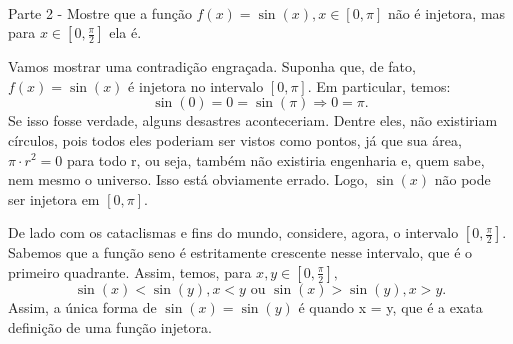\documentclass[Calculus1/exercícios_de_cálculo.tex]{subfiles}
\begin{document}
\paragraph{}Parte 2 - Mostre que a função $f(x) = \sin(x), x\in[0, \pi]$ não é injetora, mas para $x\in[0, \frac{\pi}{2}]$ ela é.
\begin{proof*}
	Vamos mostrar uma contradição engraçada. Suponha que, de fato, $f(x) = \sin(x)$ é injetora no intervalo $[0, \pi]$. Em particular, temos:
	$$
		\sin(0) = 0 = \sin(\pi) \Rightarrow 0 = \pi.
	$$
	Se isso fosse verdade, alguns desastres aconteceriam. Dentre eles, não existiriam círculos, pois todos eles poderiam ser vistos como pontos, já que sua área, $\pi\cdot{r^2} = 0$ para todo r, ou seja, também não existiria engenharia e, quem sabe, nem mesmo o universo. Isso está obviamente errado. Logo, $\sin(x)$ n\~ao pode ser injetora em $[0, \pi].$

	De lado com os cataclismas e fins do mundo, considere, agora, o intervalo $[0, \frac{\pi}{2}].$ Sabemos que a função seno é estritamente crescente nesse intervalo, que é o primeiro quadrante. Assim, temos, para $x, y\in[0, \frac{\pi}{2}],$
	$$
		\sin(x) < \sin(y), x < y \text{ ou } \sin(x) > \sin(y), x > y.
	$$
	Assim, a única forma de $\sin(x) = \sin(y)$ é quando x = y, que é a exata definição de uma função injetora.
	\qedsymbol
\end{proof*}
\end{document}
